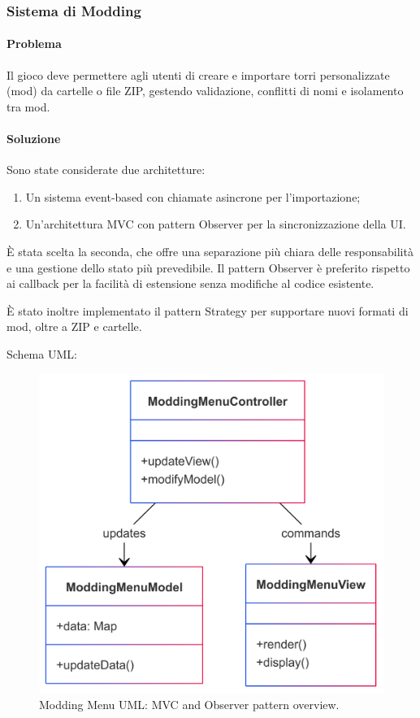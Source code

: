 \documentclass[a4paper,12pt]{report}
\begin{document}
\subsubsection{Sistema di Modding}

\paragraph{Problema} Il gioco deve permettere agli utenti di creare e importare torri personalizzate (mod) da cartelle o file ZIP, gestendo validazione, conflitti di nomi e isolamento tra mod.

\paragraph{Soluzione} Sono state considerate due architetture:
\begin{enumerate}
    \item Un sistema event-based con chiamate asincrone per l'importazione;
    \item Un'architettura MVC con pattern Observer per la sincronizzazione della UI.
\end{enumerate}
È stata scelta la seconda, che offre una separazione più chiara delle responsabilità e una gestione dello stato più prevedibile. Il pattern Observer è preferito rispetto ai callback per la facilità di estensione senza modifiche al codice esistente.

È stato inoltre implementato il pattern Strategy per supportare nuovi formati di mod, oltre a ZIP e cartelle.

Schema UML:
\begin{figure}[H]
	\centering
	\includegraphics[scale=0.08]{img/ModdingMenuUML.png}
	\caption{Modding Menu UML: MVC and Observer pattern overview.}
\end{figure}
\end{document}
